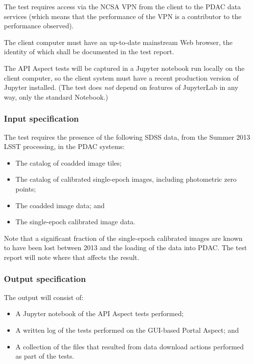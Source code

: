 The test requires access via the NCSA VPN from the client to the PDAC data services 
(which means that the performance of the VPN is a contributor to the performance observed).

The client computer must have an up-to-date mainstream Web browser, the identity of which shall be documented in the test report.

The API Aspect tests will be captured in a Jupyter notebook run locally on the client computer, so the client system must have a recent production version of Jupyter installed.
(The test does \emph{not} depend on features of JupyterLab in any way, only the standard Notebook.)


\subsubsection{Input specification}

The test requires the presence of the following SDSS data, from the Summer 2013 LSST processing, in the PDAC systems:

\begin{itemize}

  \item{The catalog of coadded image tiles;}
  \item{The catalog of calibrated single-epoch images, including photometric zero points;}
  \item{The coadded image data; and}
  \item{The single-epoch calibrated image data.}
\end{itemize}

Note that a significant fraction of the single-epoch calibrated images are known to have been lost between 2013 and the loading of the data into PDAC.
The test report will note where that affects the result.

\subsubsection{Output specification}

The output will consist of:

\begin{itemize}
  \item{A Jupyter notebook of the API Aspect tests performed;}
  \item{A written log of the tests performed on the GUI-based Portal Aspect; and}
  \item{A collection of the files that resulted from data download actions performed as part of the tests.}
\end{itemize}


